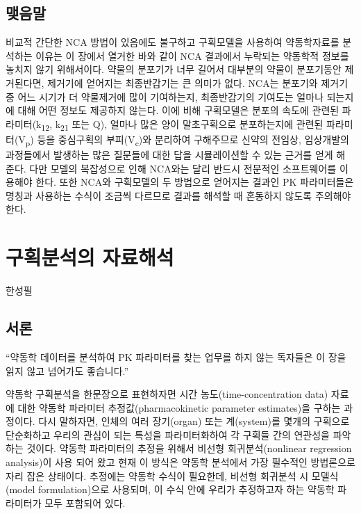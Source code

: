 \documentclass[
  11pt,
  krantz2, a4paper, twoside]{krantz}
\renewenvironment{quote}{\begin{VF}}{\end{VF}}
\theoremstyle{definition}
\theoremstyle{definition}
\theoremstyle{definition}
\theoremstyle{definition}
\theoremstyle{remark}
\begin{document}
\hypertarget{uxb9fauxc74cuxb9d0-3}{%
\section{맺음말}\label{uxb9fauxc74cuxb9d0-3}}

비교적 간단한 NCA 방법이 있음에도 불구하고 구획모델을 사용하여
약동학자료를 분석하는 이유는 이 장에서 열거한 바와 같이 NCA 결과에서
누락되는 약동학적 정보를 놓치지 않기 위해서이다. 약물의 분포기가 너무
길어서 대부분의 약물이 분포기동안 제거된다면, 제거기에 얻어지는
최종반감기는 큰 의미가 없다. NCA는 분포기와 제거기 중 어느 시기가 더
약물제거에 많이 기여하는지, 최종반감기의 기여도는 얼마나 되는지에 대해
어떤 정보도 제공하지 않는다. 이에 비해 구획모델은 분포의 속도에 관련된
파라미터(k\textsubscript{12}, k\textsubscript{21} 또는 Q), 얼마나 많은 양이 말초구획으로
분포하는지에 관련된 파라미터(V\textsubscript{p}) 등을 중심구획의 부피(V\textsubscript{c})와 분리하여
구해주므로 신약의 전임상, 임상개발의 과정들에서 발생하는 많은 질문들에
대한 답을 시뮬레이션할 수 있는 근거를 얻게 해 준다. 다만 모델의
복잡성으로 인해 NCA와는 달리 반드시 전문적인 소프트웨어를 이용해야 한다.
또한 NCA와 구획모델의 두 방법으로 얻어지는 결과인 PK 파라미터들은 명칭과
사용하는 수식이 조금씩 다르므로 결과를 해석할 때 혼동하지
않도록 주의해야 한다.

\hypertarget{ca-analysis}{%
\chapter{구획분석의 자료해석}\label{ca-analysis}}

\Large\hfill

한성필
\normalsize

\hypertarget{uxc11cuxb860-3}{%
\section{서론}\label{uxc11cuxb860-3}}

\begin{quote}
``약동학 데이터를 분석하여 PK 파라미터를 찾는 업무를 하지 않는 독자들은 이 장을 읽지 않고 넘어가도 좋습니다.''
\end{quote}

약동학 구획분석을 한문장으로 표현하자면 시간 농도(time-concentration data) 자료에 대한 약동학 파라미터 추정값(pharmacokinetic parameter estimates)을 구하는 과정이다. 
다시 말하자면, 인체의 여러 장기(organ) 또는 계(system)를 몇개의 구획으로 단순화하고 우리의 관심이 되는 특성을 파라미터화하여 각 구획들 간의 연관성을 파악하는 것이다.
약동학 파라미터의 추정을 위해서 비선형 회귀분석(nonlinear regression analysis)이 사용 되어 왔고 현재 이 방식은 약동학 분석에서 가장 필수적인 방법론으로 자리 잡은 상태이다. 
추정에는 약동학 수식이 필요한데, 비선형 회귀분석 시 모델식(model formulation)으로 사용되며, 이 수식 안에 우리가 추정하고자 하는 약동학 파라미터가 모두 포함되어 있다. 
\end{document}
